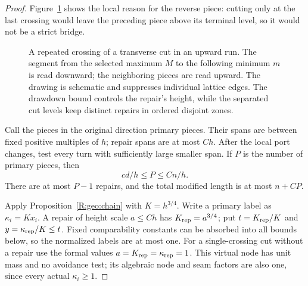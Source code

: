 \begin{proof}
Figure~\ref{R:geo:repair-figure} shows the local reason for the reverse
piece: cutting only at the last crossing would leave the preceding
piece above its terminal level, so it would not be a strict bridge.
\begin{figure}[ht]
\centering
{}
\caption{A repeated crossing of a transverse cut in an upward run.
The segment from the selected maximum $M$ to the following minimum $m$
is read downward; the neighboring pieces are read upward.  The drawing
is schematic and suppresses individual lattice edges.  The drawdown
bound controls the repair's height, while the separated cut levels keep
distinct repairs in ordered disjoint zones.}
\label{R:geo:repair-figure}
\end{figure}

Call the pieces in the original direction primary pieces.  Their spans
are between fixed positive multiples of $h$; repair spans are at most
$Ch$.  After the local port changes, test every turn with sufficiently
large smaller span.  If $P$ is the number of primary pieces, then
\begin{equation}\label{R:geo:primary-count}
                         c d/h\le P\le Cn/h.
\end{equation}
There are at most $P-1$ repairs, and the total modified length is at
most $n+CP$.

Apply Proposition~\ref{R:geo:chain} with $K=h^{3/4}$.  Write a
primary label as $\kappa_i=Kx_i$.  A repair of height scale $a\le Ch$
has $K_{\rm rep}=a^{3/4}$; put
$t=K_{\rm rep}/K$ and $y=\kappa_{\rm rep}/K\le t$.
Fixed comparability constants can be absorbed into all bounds below,
so the normalized labels are at most one.  For a single-crossing cut
without a repair use the formal values $a=K_{\rm rep}=\kappa_{\rm rep}=1$.
This virtual node has unit mass and no avoidance test; its algebraic
node and seam factors are also one, since every actual $\kappa_i\ge1$.


\end{proof}
